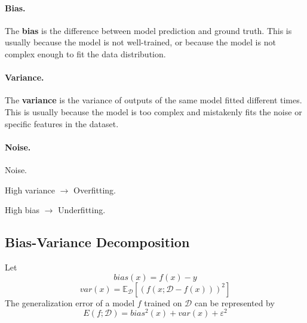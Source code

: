 \paragraph{Bias.} The \textbf{bias} is the difference between model prediction and ground truth. This is usually because the model is not well-trained, or because the model is not complex enough to fit the data distribution.
\paragraph{Variance.} The \textbf{variance} is the variance of outputs of the same model fitted different times. This is usually because the model is too complex and mistakenly fits the noise or specific features in the dataset.
\paragraph{Noise.} Noise.

High variance $\to$ Overfitting.

High bias $\to$ Underfitting.

\subsection{Bias-Variance Decomposition}
Let
\[ bias(x) = f(x) - y \]
\[ var(x) = \mathbb{E}_{\mathcal{D}}[(f(x;\mathcal{D}-f(x)))^2] \]
The generalization error of a model $f$ trained on $\mathcal{D}$ can be represented by
\[ E(f;\mathcal{D}) = bias^2(x) + var(x) + \varepsilon^2 \]
